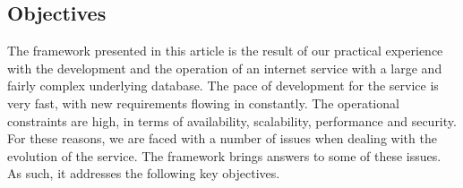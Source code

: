 \subsection{Objectives}

The framework presented in this article is the result of our practical experience with the development and the operation of an internet service with a large and fairly complex underlying database. The pace of development for the service is very fast, with new requirements flowing in constantly. The operational constraints are high, in terms of availability, scalability, performance and security. For these reasons, we are faced with a number of issues when dealing with the evolution of the service. The framework brings answers to some of these issues. As such, it addresses the following key objectives.

